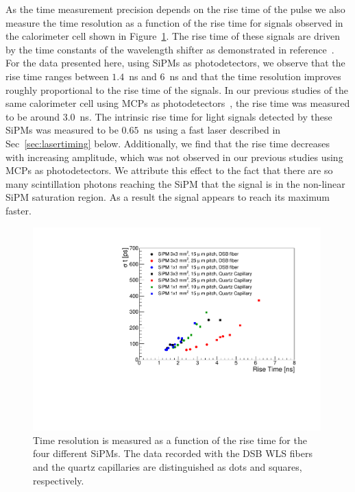 As the time measurement precision depends on the rise time of the pulse we also
measure the time resolution as a function of the rise time for signals observed
in the calorimeter cell shown in Figure~\ref{RiseTime}. The rise time of these
signals are driven by the time constants of the wavelength shifter as
demonstrated in reference~\cite{Anderson:2015gha}. For the data presented here,
using SiPMs as photodetectors, we observe that the rise time ranges between
$1.4$~ns and $6$~ns and that the time resolution improves roughly proportional
to the rise time of the signals. In our previous studies of the same calorimeter 
cell using MCPs as photodetectors~\cite{Anderson:2015gha}, the rise time was measured to be around 
$3.0$~ns. The intrinsic rise time for light signals detected by these SiPMs was
measured to be $0.65$~ns using a fast laser described in Sec~\ref{sec:lasertiming} below. 
Additionally, we find that the rise time decreases with increasing amplitude, which was
not observed in our previous studies using MCPs as photodetectors. We attribute 
this effect to the fact that there are so many scintillation photons reaching the SiPM that
the signal is in the non-linear SiPM saturation region. As a result the signal 
appears to reach its maximum faster. 

\begin{figure}[!htb]
\centering
\includegraphics[width=0.99\textwidth]{figures/ShashlikTimeResolutionVsRiseTime.pdf}
\caption{\label{RiseTime}Time resolution is measured as a function of the rise time
for the four different SiPMs. The data recorded with the DSB WLS fibers and the
quartz capillaries are distinguished as dots and squares, respectively. }
\end{figure}

